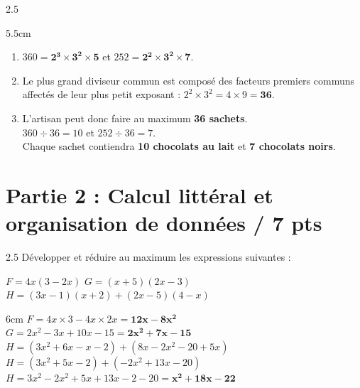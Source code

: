 \documentclass[a4paper]{book}
\begin{document}
{\begin{exerciceNote}{2.5}
        \begin{ZoneReponse}{5.5cm}
        \color{blue}
        \begin{enumerate}
            \item $360 = \mathbf{2^3 \times 3^2 \times 5}$ \quad et \quad $252 = \mathbf{2^2 \times 3^2 \times 7}$.
            \item Le plus grand diviseur commun est composé des facteurs premiers communs affectés de leur plus petit exposant : $2^2 \times 3^2 = 4 \times 9 = \mathbf{36}$.
            \item L'artisan peut donc faire au maximum \textbf{36 sachets}.\\
            $360 \div 36 = 10$ et $252 \div 36 = 7$.\\
            Chaque sachet contiendra \textbf{10 chocolats au lait} et \textbf{7 chocolats noirs}.
        \end{enumerate}
        \end{ZoneReponse}
    \end{exerciceNote}
    
    
\section*{Partie 2 : Calcul littéral et organisation de données \points[2]/ 7 pts }

    \begin{exerciceNote}{2.5}
        Développer et réduire au maximum les expressions suivantes :
        \medskip
        
        $F = 4x(3 - 2x)$ \hspace{1cm} $G = (x + 5)(2x - 3)$ \hspace{1cm} $H = (3x - 1)(x + 2) + (2x - 5)(4 - x)$
        
        \begin{ZoneReponse}{6cm}
        \color{blue}
        $F = 4x \times 3 - 4x \times 2x = \mathbf{12x - 8x^2}$ \\[0.3cm]
        $G = 2x^2 - 3x + 10x - 15 = \mathbf{2x^2 + 7x - 15}$ \\[0.3cm]
        $H = (3x^2 + 6x - x - 2) + (8x - 2x^2 - 20 + 5x)$ \\
        $H = (3x^2 + 5x - 2) + (-2x^2 + 13x - 20)$ \\
        $H = 3x^2 - 2x^2 + 5x + 13x - 2 - 20 = \mathbf{x^2 + 18x - 22}$
        \end{ZoneReponse}
    \end{exerciceNote}
    
}
\end{document}
